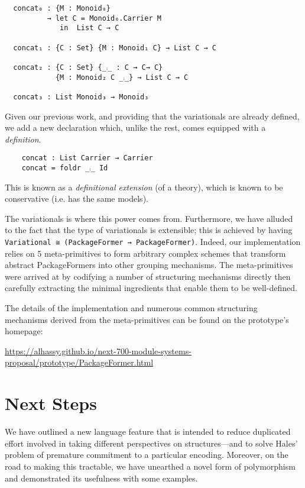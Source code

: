 \documentclass[sigplan,screen]{acmart}
\begin{document}
\vspace{1em}
\begin{verbatim}
  concat₀ : {M : Monoid₀}
          → let C = Monoid₀.Carrier M
             in  List C → C

  concat₁ : {C : Set} {M : Monoid₁ C} → List C → C

  concat₂ : {C : Set} {_⨾_ : C → C→ C}
            {M : Monoid₂ C _⨾_} → List C → C

  concat₃ : List Monoid₃ → Monoid₃
\end{verbatim}
\vspace{1em}

\noindent
Given our previous work, and providing that the variationals are already
defined, we add a new declaration which, unlike the rest, comes
equipped with a \emph{definition}.
  \vspace{0.3em}
\begin{verbatim}
    concat : List Carrier → Carrier
    concat = foldr _⨾_ Id
\end{verbatim}
\noindent This is known as a \emph{definitional extension} (of a theory), which
is known to be conservative (i.e. has the same models).

The variationals is where this power comes from.  Furthermore, we have alluded to
the fact that the type of variationals
is extensible; this is achieved by having
\texttt{Variational ≅ (PackageFormer → PackageFormer)}.
Indeed, our implementation relies on 5 meta-primitives to form arbitrary
complex schemes that transform abstract PackageFormers into
other grouping mechanisms. The meta-primitives were arrived at by codifying
a number of structuring mechanisms directly then carefully extracting the minimal
ingredients that enable them to be well-defined.

The details of the implementation and numerous common structuring mechanisms
derived from the meta-primitives can be found on the prototype's homepage:
\begin{center}
\url{https://alhassy.github.io/next-700-module-systems-proposal/prototype/PackageFormer.html}
\end{center}

\section{Next Steps}
\label{sec:orgba76809}
We have outlined a new language feature that is intended to reduce
duplicated effort involved in taking different perspectives on structures---and to solve
Hales' problem of premature commitment to a particular encoding. Moreover, on the road
to making this tractable, we have unearthed a novel form of polymorphism and demonstrated
its usefulness with some examples.
\end{document}
